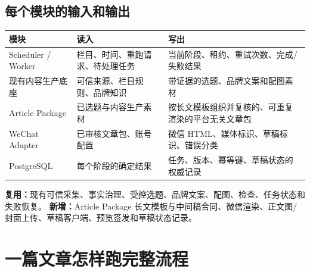 \documentclass[UTF8,10pt,a4paper,fontset=none]{ctexart}
\begin{document}
\subsection*{每个模块的输入和输出}
\begin{tabularx}{\textwidth}{@{}L{35mm} Y Y@{}}
\toprule
\textbf{模块} & \textbf{读入} & \textbf{写出} \\
\midrule
Scheduler / Worker & 栏目、时间、重跑请求、待处理任务 & 当前阶段、租约、重试次数、完成/失败结果 \\
现有内容生产底座 & 可信来源、栏目规则、品牌知识 & 带证据的选题、品牌文案和配图素材 \\
Article Package & 已选题与内容生产素材 & 按长文模板组织并复核的、可重复渲染的平台无关文章包 \\
WeChat Adapter & 已审核文章包、账号配置 & 微信 HTML、媒体标识、草稿标识、错误分类 \\
PostgreSQL & 每个阶段的确定结果 & 任务、版本、幂等键、草稿状态的权威记录 \\
\bottomrule
\end{tabularx}

\begin{greenbox}[复用 / 新增边界]
\textbf{复用：}现有可信采集、事实治理、受控选题、品牌文案、配图、检查、任务状态和失败恢复。\quad
\textbf{新增：}Article Package 长文模板与中间稿合同、微信渲染、正文图/封面上传、草稿客户端、预览签发和草稿状态记录。
\end{greenbox}

\clearpage

\section{一篇文章怎样跑完整流程}
\end{document}

